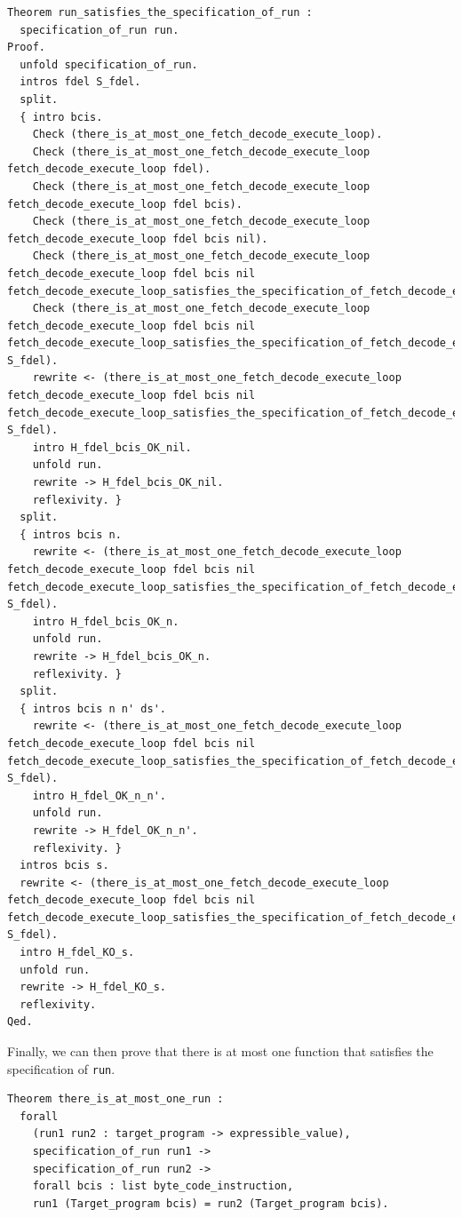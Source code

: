 \documentclass{article}
\begin{document}
\begin{lstlisting}
Theorem run_satisfies_the_specification_of_run :
  specification_of_run run.
Proof.
  unfold specification_of_run.
  intros fdel S_fdel.
  split.
  { intro bcis.
    Check (there_is_at_most_one_fetch_decode_execute_loop).
    Check (there_is_at_most_one_fetch_decode_execute_loop fetch_decode_execute_loop fdel).
    Check (there_is_at_most_one_fetch_decode_execute_loop fetch_decode_execute_loop fdel bcis).
    Check (there_is_at_most_one_fetch_decode_execute_loop fetch_decode_execute_loop fdel bcis nil).
    Check (there_is_at_most_one_fetch_decode_execute_loop fetch_decode_execute_loop fdel bcis nil fetch_decode_execute_loop_satisfies_the_specification_of_fetch_decode_execute_loop).
    Check (there_is_at_most_one_fetch_decode_execute_loop fetch_decode_execute_loop fdel bcis nil fetch_decode_execute_loop_satisfies_the_specification_of_fetch_decode_execute_loop S_fdel).
    rewrite <- (there_is_at_most_one_fetch_decode_execute_loop fetch_decode_execute_loop fdel bcis nil fetch_decode_execute_loop_satisfies_the_specification_of_fetch_decode_execute_loop S_fdel).
    intro H_fdel_bcis_OK_nil.
    unfold run.
    rewrite -> H_fdel_bcis_OK_nil.
    reflexivity. }
  split.
  { intros bcis n.
    rewrite <- (there_is_at_most_one_fetch_decode_execute_loop fetch_decode_execute_loop fdel bcis nil fetch_decode_execute_loop_satisfies_the_specification_of_fetch_decode_execute_loop S_fdel).
    intro H_fdel_bcis_OK_n.
    unfold run.
    rewrite -> H_fdel_bcis_OK_n.
    reflexivity. }
  split.
  { intros bcis n n' ds'.
    rewrite <- (there_is_at_most_one_fetch_decode_execute_loop fetch_decode_execute_loop fdel bcis nil fetch_decode_execute_loop_satisfies_the_specification_of_fetch_decode_execute_loop S_fdel).
    intro H_fdel_OK_n_n'.
    unfold run.
    rewrite -> H_fdel_OK_n_n'.
    reflexivity. }
  intros bcis s.
  rewrite <- (there_is_at_most_one_fetch_decode_execute_loop fetch_decode_execute_loop fdel bcis nil fetch_decode_execute_loop_satisfies_the_specification_of_fetch_decode_execute_loop S_fdel).
  intro H_fdel_KO_s.
  unfold run.
  rewrite -> H_fdel_KO_s.
  reflexivity.
Qed. 
\end{lstlisting}

Finally, we can then prove that there is at most one function that satisfies the specification of \texttt{run}. 

\begin{lstlisting}
Theorem there_is_at_most_one_run :
  forall
    (run1 run2 : target_program -> expressible_value),
    specification_of_run run1 ->
    specification_of_run run2 ->
    forall bcis : list byte_code_instruction,
    run1 (Target_program bcis) = run2 (Target_program bcis).
\end{lstlisting}
\end{document}
